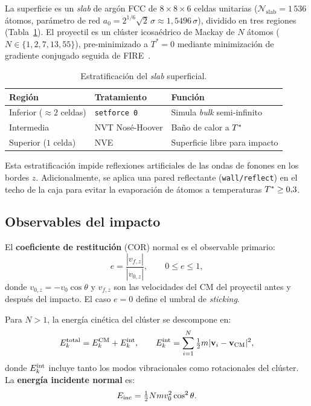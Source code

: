La superficie es un \textit{slab} de argón FCC de $8\times8\times6$ celdas
unitarias ($\mathcal{N}_{\mathrm{slab}} = 1\,536$ átomos, parámetro de red
$a_0 = 2^{1/6}\sqrt{2}\,\sigma \approx 1{,}5496\,\sigma$), dividido en tres
regiones (Tabla~\ref{tab:regiones}). El proyectil es un clúster icosaédrico de
Mackay de $N$ átomos ($N \in \{1, 2, 7, 13, 55\}$), pre-minimizado a $T^*=0$
mediante minimización de gradiente conjugado seguida de FIRE~\cite{Bitzek2006}.

\begin{table}[ht]
    \centering
    \small
    \caption{Estratificación del \textit{slab} superficial.}
    \label{tab:regiones}
    \begin{tabular}{lll}
        \toprule
        Región & Tratamiento & Función \\
        \midrule
        Inferior ($\approx 2$ celdas) & \texttt{setforce 0} & Simula \textit{bulk} semi-infinito \\
        Intermedia & NVT Nosé-Hoover & Baño de calor a $T^{*}$ \\
        Superior ($1$ celda) & NVE & Superficie libre para impacto \\
        \bottomrule
    \end{tabular}
\end{table}

Esta estratificación impide reflexiones artificiales de las ondas de fonones en
los bordes $z$. Adicionalmente, se aplica una pared reflectante
(\texttt{wall/reflect}) en el techo de la caja para evitar la evaporación de
átomos a temperaturas $T^{*} \geq 0{,}3$.

\subsection{Observables del impacto}
\label{sec:observables}

El \textbf{coeficiente de restitución} (COR) normal es el observable primario:
%
\begin{equation}
    e = \frac{|v_{f,z}|}{|v_{0,z}|}, \qquad 0 \leq e \leq 1,
    \label{eq:cor}
\end{equation}
%
donde $v_{0,z} = -v_0\cos\theta$ y $v_{f,z}$ son las velocidades del CM del
proyectil antes y después del impacto. El caso $e=0$ define el umbral de
\textit{sticking}.

Para $N>1$, la energía cinética del clúster se descompone en:
%
\begin{equation}
    E_k^{\mathrm{total}} = E_k^{\mathrm{CM}} + E_k^{\mathrm{int}},
    \qquad
    E_k^{\mathrm{int}} = \sum_{i=1}^N \tfrac{1}{2}m|\mathbf{v}_i - \mathbf{v}_{\mathrm{CM}}|^2,
    \label{eq:ek_descomp}
\end{equation}
%
donde $E_k^{\mathrm{int}}$ incluye tanto los modos vibracionales como rotacionales del
clúster. La \textbf{energía incidente normal} es:
%
\begin{equation}
    E_{\mathrm{inc}} = \tfrac{1}{2}N m v_0^2\cos^2\theta.
    \label{eq:einc}
\end{equation}

